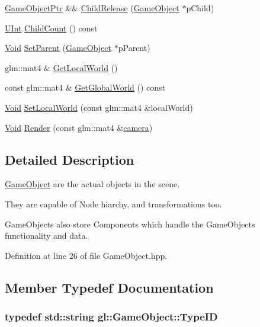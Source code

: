 \begin{DoxyCompactItemize}
\hyperlink{namespacegl_a4caed01d7776fc4f8768dbf8d88d0388}{Game\-Object\-Ptr} \&\& \hyperlink{classgl_1_1_game_object_a11ceceb648f4b90da4465d0ac0177057}{Child\-Release} (\hyperlink{classgl_1_1_game_object}{Game\-Object} $\ast$p\-Child)
\item 
\hyperlink{_basic_types_8hpp_a11c112f01a7ad8f767fd48bc916463a3}{U\-Int} \hyperlink{classgl_1_1_game_object_ac663a2b621e729dcb34a0a9e06915e26}{Child\-Count} () const 
\item 
\hyperlink{_basic_types_8hpp_afdf0f22c576e6ee1b982f64b839c4bea}{Void} \hyperlink{classgl_1_1_game_object_a470ffd663dd64d99d8e0620ee145c6be}{Set\-Parent} (\hyperlink{classgl_1_1_game_object}{Game\-Object} $\ast$p\-Parent)
\item 
glm\-::mat4 \& \hyperlink{classgl_1_1_game_object_a50205a28ddada11ebe9845a74102608d}{Get\-Local\-World} ()
\item 
const glm\-::mat4 \& \hyperlink{classgl_1_1_game_object_a5231499fc5be4d31391d91b5182aae10}{Get\-Global\-World} () const 
\item 
\hyperlink{_basic_types_8hpp_afdf0f22c576e6ee1b982f64b839c4bea}{Void} \hyperlink{classgl_1_1_game_object_a21baa7622c55cb7f517e7135aac10340}{Set\-Local\-World} (const glm\-::mat4 \&local\-World)
\item 
\hyperlink{_basic_types_8hpp_afdf0f22c576e6ee1b982f64b839c4bea}{Void} \hyperlink{classgl_1_1_game_object_a3d04c8aa54ff7ed474163d104ae8245f}{Render} (const glm\-::mat4 \&\hyperlink{namespacegl_a5580e107f8adbdc0f887df19caebb589}{camera})
\end{DoxyCompactItemize}


\subsection{Detailed Description}
\hyperlink{classgl_1_1_game_object}{Game\-Object} are the actual objects in the scene.

They are capable of Node hiarchy, and transformations too.

Game\-Objects also store Components which handle the Game\-Objects functionality and data. 

Definition at line 26 of file Game\-Object.\-hpp.



\subsection{Member Typedef Documentation}
\hypertarget{classgl_1_1_game_object_af0b06465180bf63b80fe2b6d1288e4a8}{
\subsubsection[{Type\-I\-D}]{\setlength{\rightskip}{0pt plus 5cm}typedef std\-::string {\bf gl\-::\-Game\-Object\-::\-Type\-I\-D}}}\label{classgl_1_1_game_object_af0b06465180bf63b80fe2b6d1288e4a8}


